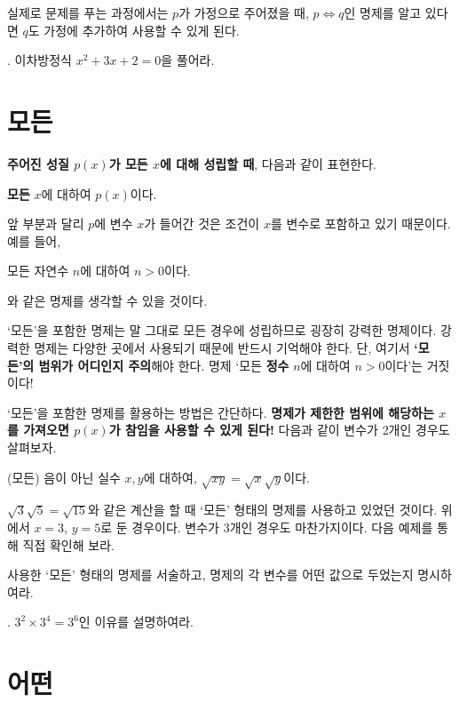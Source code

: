실제로 문제를 푸는 과정에서는 \(p\)가 가정으로 주어졌을 때, \(p \iff q\)인 명제를 알고 있다면 \(q\)도 가정에 추가하여 사용할 수 있게 된다.

\bigskip

\ex. 이차방정식 \(x^2 + 3x + 2 = 0\)을 풀어라.

\pagebreak

\section{모든}

\textbf{주어진 성질 \(p(x)\)가 모든 \(x\)에 대해 성립할 때}, 다음과 같이 표현한다.
\begin{center}
    \textbf{모든} \(x\)에 대하여 \(p(x)\)이다.
\end{center}
앞 부분과 달리 \(p\)에 변수 \(x\)가 들어간 것은 조건이 \(x\)를 변수로 포함하고 있기 때문이다. 예를 들어,
\begin{center}
    모든 자연수 \(n\)에 대하여 \(n > 0\)이다.
\end{center}
와 같은 명제를 생각할 수 있을 것이다.

`모든'을 포함한 명제는 말 그대로 모든 경우에 성립하므로 굉장히 강력한 명제이다. 강력한 명제는 다양한 곳에서 사용되기 때문에 반드시 기억해야 한다. 단, 여기서 \textbf{`모든'의 범위가 어디인지 주의}해야 한다. 명제 `모든 \textbf{정수} \(n\)에 대하여 \(n > 0\)이다'는 거짓이다!

`모든'을 포함한 명제를 활용하는 방법은 간단하다. \textbf{명제가 제한한 범위에 해당하는 \(x\)를 가져오면 \(p(x)\)가 참임을 사용할 수 있게 된다!} 다음과 같이 변수가 2개인 경우도 살펴보자.
\begin{center}
    (모든) 음이 아닌 실수 \(x, y\)에 대하여, \(\sqrt{xy} = \sqrt{x}\sqrt{y}\)이다.
\end{center}
\(\sqrt{3}\sqrt{5} = \sqrt{15}\)와 같은 계산을 할 때 `모든' 형태의 명제를 사용하고 있었던 것이다. 위에서 \(x = 3\), \(y = 5\)로 둔 경우이다. 변수가 3개인 경우도 마찬가지이다. 다음 예제를 통해 직접 확인해 보라.

사용한 `모든' 형태의 명제를 서술하고, 명제의 각 변수를 어떤 값으로 두었는지 명시하여라.

\bigskip

\ex. \(3^2 \times 3^4 = 3^6\)인 이유를 설명하여라.

\pagebreak

\section{어떤}

